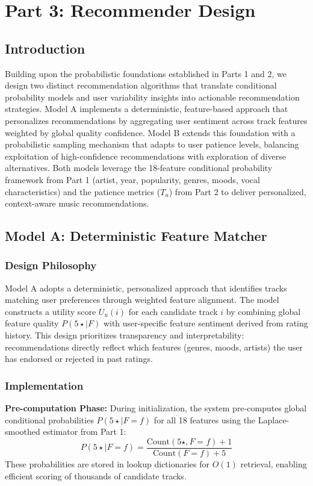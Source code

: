 \documentclass[12pt,a4paper]{article}
\begin{document}
\section{Part 3: Recommender Design}

\subsection{Introduction}
Building upon the probabilistic foundations established in Parts 1 and 2, we design two distinct recommendation algorithms that translate conditional probability models and user variability insights into actionable recommendation strategies. Model A implements a deterministic, feature-based approach that personalizes recommendations by aggregating user sentiment across track features weighted by global quality confidence. Model B extends this foundation with a probabilistic sampling mechanism that adapts to user patience levels, balancing exploitation of high-confidence recommendations with exploration of diverse alternatives. Both models leverage the 18-feature conditional probability framework from Part 1 (artist, year, popularity, genres, moods, vocal characteristics) and the patience metrics ($T_u$) from Part 2 to deliver personalized, context-aware music recommendations.

\subsection{Model A: Deterministic Feature Matcher}

\subsubsection{Design Philosophy}
Model A adopts a deterministic, personalized approach that identifies tracks matching user preferences through weighted feature alignment. The model constructs a utility score $U_u(i)$ for each candidate track $i$ by combining global feature quality $P(5\star \mid F)$ with user-specific feature sentiment derived from rating history. This design prioritizes transparency and interpretability: recommendations directly reflect which features (genres, moods, artists) the user has endorsed or rejected in past ratings.

\subsubsection{Implementation}

\textbf{Pre-computation Phase:} During initialization, the system pre-computes global conditional probabilities $P(5\star \mid F = f)$ for all 18 features using the Laplace-smoothed estimator from Part 1:
\begin{equation}
P(5\star \mid F = f) = \frac{\text{Count}(5\star, F=f) + 1}{\text{Count}(F=f) + 5}
\end{equation}
These probabilities are stored in lookup dictionaries for $O(1)$ retrieval, enabling efficient scoring of thousands of candidate tracks.
\end{document}
